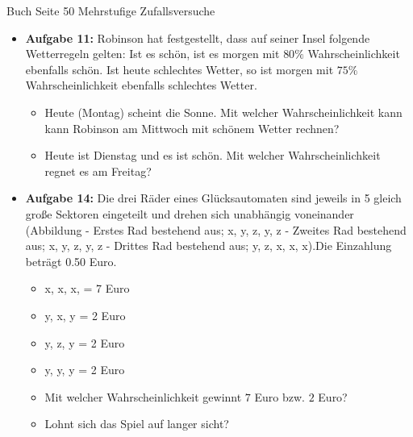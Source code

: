\documentclass[11pt,a4paper,oneside]{article}
\begin{document}
		\begin{aufgabe}{ Buch Seite 50 Mehrstufige Zufallsversuche}
		\begin{itemize}
			\item \textbf{Aufgabe 11:} Robinson hat festgestellt, dass auf seiner Insel folgende Wetterregeln gelten: Ist es schön, ist es morgen mit $80\%$ Wahrscheinlichkeit ebenfalls schön. Ist heute schlechtes Wetter, so ist morgen mit $75\%$ Wahrscheinlichkeit ebenfalls schlechtes Wetter. 
			\begin{itemize}
				\item Heute (Montag) scheint die Sonne. Mit welcher Wahrscheinlichkeit kann kann Robinson am Mittwoch mit schönem Wetter rechnen? 
				\item Heute ist Dienstag und es ist schön. Mit welcher Wahrscheinlichkeit regnet es am Freitag? 
			\end{itemize}
			\item \textbf{Aufgabe 14:} Die drei Räder eines Glücksautomaten sind jeweils in 5 gleich große Sektoren eingeteilt und drehen sich unabhängig voneinander (Abbildung - Erstes Rad bestehend aus; x, y, z, y, z - Zweites Rad bestehend aus; x, y, z, y, z - Drittes Rad bestehend aus; y, z, x, x, x).Die Einzahlung beträgt 0.50 Euro.
			\begin{itemize}
				\item x, x, x, = 7 Euro 
				\item y, x, y = 2 Euro
				\item y, z, y = 2 Euro 
				\item  y, y, y = 2 Euro 
			\end{itemize} 
			\begin{itemize}
				\item Mit welcher Wahrscheinlichkeit gewinnt $7$ Euro bzw. $2$ Euro? 
				\item Lohnt sich das Spiel auf langer sicht? 
			\end{itemize}
		\end{itemize}
	\end{aufgabe}
	
\end{document}
